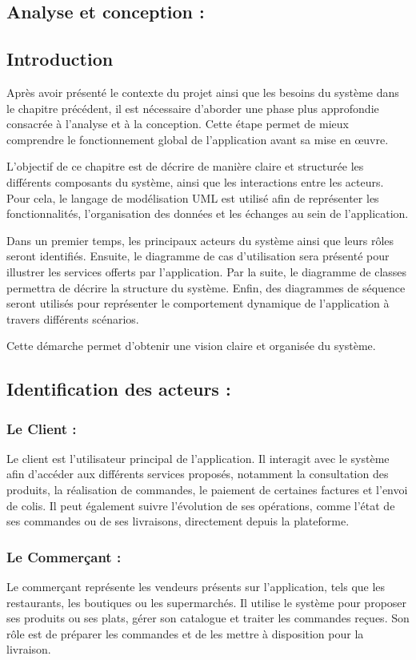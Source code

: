 \documentclass[12pt,fleqn,a4paper]{report}
\begin{document}
\begin{justify}
\chapter{Analyse et conception :}
\section{Introduction}
Après avoir présenté le contexte du projet ainsi que les besoins du système dans le chapitre précédent, il est nécessaire d'aborder une phase plus approfondie consacrée à l'analyse et à la conception. Cette étape permet de mieux comprendre le fonctionnement global de l'application avant sa mise en œuvre.

L'objectif de ce chapitre est de décrire de manière claire et structurée les différents composants du système, ainsi que les interactions entre les acteurs. Pour cela, le langage de modélisation UML est utilisé afin de représenter les fonctionnalités, l'organisation des données et les échanges au sein de l'application.

Dans un premier temps, les principaux acteurs du système ainsi que leurs rôles seront identifiés. Ensuite, le diagramme de cas d'utilisation sera présenté pour illustrer les services offerts par l'application. Par la suite, le diagramme de classes permettra de décrire la structure du système. Enfin, des diagrammes de séquence seront utilisés pour représenter le comportement dynamique de l'application à travers différents scénarios.

Cette démarche permet d'obtenir une vision claire et organisée du système.

\section{Identification des acteurs :}
\subsection{Le Client :}
Le client est l'utilisateur principal de l'application. Il interagit avec le système afin d'accéder aux différents services proposés, notamment la consultation des produits, la réalisation de commandes, le paiement de certaines factures et l'envoi de colis. Il peut également suivre l'évolution de ses opérations, comme l'état de ses commandes ou de ses livraisons, directement depuis la plateforme.

\subsection{Le Commerçant :}
Le commerçant représente les vendeurs présents sur l'application, tels que les restaurants, les boutiques ou les supermarchés. Il utilise le système pour proposer ses produits ou ses plats, gérer son catalogue et traiter les commandes reçues. Son rôle est de préparer les commandes et de les mettre à disposition pour la livraison.


\end{justify}
\end{document}

